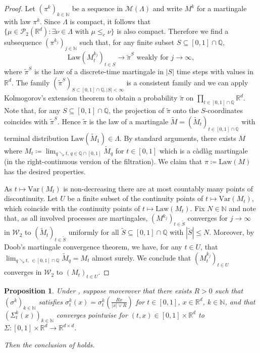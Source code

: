 \documentclass[12pt,oneside]{amsart}
\newtheorem{proposition}[theorem]{Proposition}
\theoremstyle{definition}
\newcommand{\Law}{\mathrm{Law}}
\newcommand{\N}{\mathbb N}
\newcommand{\R}{\mathbb R}
\def\Q{{\mathbb Q}}
\def\R{{\mathbb R}}
\numberwithin{equation}{section}
\begin{document}
\begin{proof}
    Let $(\pi^k)_{k \in \N}$ be a sequence in $\mathcal M(\Lambda)$ and write $M^k$ for a martingale with law $\pi^k$.
    Since $\Lambda$ is compact, it follows
    that $\{ \mu \in \mathcal P_2(\R^d) \colon \exists \nu \in \Lambda \mbox{ with }\mu \le_c \nu \}$ is also compact.
    Therefore we find a subsequence $(\pi^{k_j})_{j \in \N}$ such that, for any finite subset $S \subseteq [0,1] \cap \mathbb Q$,
    \begin{equation}
        \Law(M_t^{k_j})_{t \in S} \to \tilde \pi^S \mbox{ weakly for }j\to\infty,    
    \end{equation}
    where $\tilde \pi^S$ is the law of a discrete-time martingale in $|S|$ time steps with values in $\R^d$.
    The family $(\tilde \pi^S)_{S \subset [0,1] \cap \mathbb Q, |S| < \infty}$ is a consistent family and we can apply Kolmogorov's extension theorem to obtain a probability $\tilde \pi$ on $\prod_{t \in [0,1] \cap \mathbb Q} \mathbb R^d$.
    Note that, for any $S \subseteq [0,1] \cap \mathbb Q$, the projection of $\tilde \pi$ onto the $S$-coordinates coincides with $\tilde \pi^S$.
    Hence $\tilde \pi$ is the law of a martingale $\tilde M = (\tilde M_t)_{t \in [0,1] \cap \Q}$ with terminal distribution $\Law(\tilde M_1) \in \Lambda$.
    By standard arguments, there exists $M$ where $M_t \coloneqq \lim_{q \searrow t, \, q \in \Q \cap [0,1]} \tilde M_q$ for $t \in [0,1]$ which is a c\`adl\`ag martingale (in the right-continuous version of the filtration).
    We claim that $\pi \coloneqq \Law(M)$ has the desired properties.

    As $t \mapsto \textrm{Var}(M_t)$ is non-decreasing there are at most countably many points of discontinuity.
    Let $U$ be a finite subset of the continuity points of $t \mapsto \textrm{Var}(M_t)$, which coincide with the continuity points of $t \mapsto \Law(M_t)$.
    Fix $N \in \N$ and note that, as all involved processes are martingales, $(M^{k_j})_{t \in \tilde S}$ converges for $j \to \infty$ in $\mathcal W_2$ to $(\tilde M_t)_{t \in \tilde S}$ uniformly for all $\tilde S \subseteq [0,1] \cap \Q$ with $|\tilde S|\le N$.
    Moreover, by Doob's martingale convergence theorem, we have, for any $t \in U$, that $\lim_{q \searrow t, \, \in [0,1] \cap \Q} \tilde M_q = M_t$ almost surely.
    We conclude that $(M^{k_j}_t)_{t \in U}$ converges in $\mathcal W_2$ to $(M_t)_{t \in U}$.
\end{proof}

\begin{proposition}
    \label{prop:fdd_convergence}
    Under , suppose moverover that there exists $R > 0$ such that $(\sigma^k)_{k \in \N}$ satisfies $\sigma^k_t(x) = \sigma^k_t(\frac{R x}{|x| \vee R})$ for $t \in [0, 1]$, $x \in \R^d$, $k \in \N$, and that $(\Sigma^k_t(x))_{k \in \N}$ converges pointwise for $(t,x) \in [0,1] \times \R^d$ to $\Sigma \colon [0,1] \times \R^d \to \R^{d \times d}$.
	
    Then the conclusion of  holds.
\end{proposition}
\end{document}
